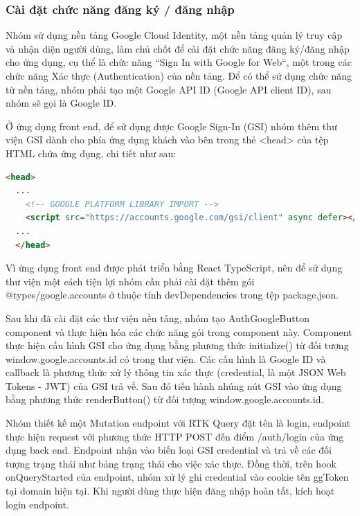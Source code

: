 \subsubsection{Cài đặt chức năng đăng ký / đăng nhập} \label{subsubsec:CaiDatDangKyDangNhap}

\tab Nhóm sử dụng nền tảng Google Cloud Identity, một nền tảng quản lý truy cập và nhận diện người dùng, làm chủ chốt để cài đặt chức năng đăng ký/đăng nhập cho ứng dụng, cụ thể là chức năng “Sign In with Google for Web“, một trong các chức năng Xác thực (Authentication) của nền tảng. Để có thể sử dụng chức năng từ nền tảng, nhóm phải tạo một Google API ID (Google API client ID), sau nhóm sẽ gọi là Google ID.
\par

Ở ứng dụng front end, để sử dụng được Google Sign-In (GSI) nhóm thêm thư viện GSI dành cho phía ứng dụng khách vào bên trong thẻ <head> của tệp HTML chứa ứng dụng, chi tiết như sau:
\par

\lstset{style=mystyle}
\begin{lstlisting}[language=HTML, caption=Thêm thư viện GSI vào ứng dụng]
  <head>
  ...
    <!-- GOOGLE PLATFORM LIBRARY IMPORT -->
    <script src="https://accounts.google.com/gsi/client" async defer></script>
  ...
  </head>
\end{lstlisting}

Vì ứng dụng front end được phát triển bằng React TypeScript, nên để sử dụng thư viện một cách tiện lợi nhóm cần phải cài đặt thêm gói @types/google.accounts ở thuộc tính devDependencies trong tệp package.json.

Sau khi đã cài đặt các thư viện nền tảng, nhóm tạo AuthGoogleButton component và thực hiện hóa các chức năng gói trong component này. Component thực hiện cấu hình GSI cho ứng dụng bằng phương thức initialize() từ đối tượng window.google.accounts.id có trong thư viện. Các cấu hình là Google ID và callback là phương thức xử lý thông tin xác thực (credential, là một JSON Web Tokens - JWT) của GSI trả về. Sau đó tiến hành nhúng nút GSI vào ứng dụng bằng phương thức renderButton() từ đối tượng window.google.accounts.id.

Nhóm thiết kế một Mutation endpoint với RTK Query đặt tên là login, endpoint thực hiện request với phương thức HTTP POST đến điểm /auth/login của ứng dụng back end. Endpoint nhận vào biến loại GSI credential và trả về các đối tượng trạng thái như bảng trạng thái cho việc xác thực. Đồng thời, trên hook onQueryStarted của endpoint, nhóm xử lý ghi credential vào cookie tên ggToken tại domain hiện tại. Khi người dùng thực hiện đăng nhập hoàn tất, kích hoạt login endpoint.

